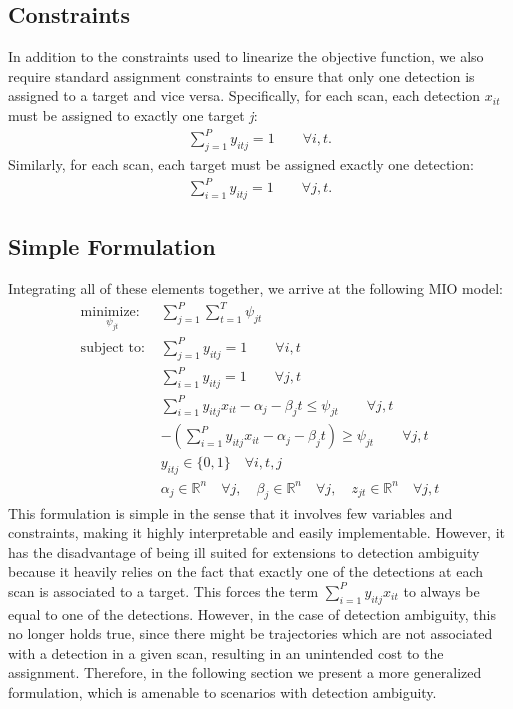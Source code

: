 \subsection{Constraints}
In addition to the constraints used to linearize the objective function, we also require standard assignment constraints to ensure that only one detection is assigned to a target and vice versa. Specifically, for each scan, each detection $x_{it}$ must be assigned to exactly one target \textit{j}:
\begin{align}\label{eq:all_detections}
\sum_{j=1}^{P} y_{itj} = 1 \qquad \forall i,t.
\end{align}
Similarly, for each scan, each target must be assigned exactly one detection:
\begin{align}\label{eq:all_targets}
\sum_{i=1}^{P} y_{itj} = 1 \qquad \forall j,t.
\end{align}

\subsection{Simple Formulation}
Integrating all of these elements together, we arrive at the following MIO model:
\begin{align}
\underset{\psi_{jt}}{\text{minimize: }} & \sum_{j=1}^{P} \sum_{t=1}^{T} \psi_{jt} \label{eq:simple_problem} \\
\text{subject to: }	& \sum_{j=1}^{P} y_{itj} = 1 \qquad \forall i,t\nonumber \\
				& \sum_{i=1}^{P} y_{itj} = 1 \qquad \forall j,t\nonumber \\
				& \sum_{i=1}^{P}y_{itj}x_{it} - \alpha_{j} - \beta_{j}t \leq \psi_{jt} \qquad \forall j,t \nonumber \\
				& -\left(\sum_{i=1}^{P}y_{itj}x_{it} - \alpha_{j} - \beta_{j}t\right) \geq \psi_{jt} \qquad \forall j,t \nonumber \\
			 	& y_{itj} \in \{0,1\} \quad \forall i,t,j \nonumber\\
				& \alpha_{j} \in \mathbb{R}^n \quad \forall j,\quad \beta_{j} \in \mathbb{R}^n \quad \forall j, \quad z_{jt} \in \mathbb{R}^n \quad \forall j,t \nonumber
\end{align}
This formulation is simple in the sense that it involves few variables and constraints, making it highly interpretable and easily implementable. However, it has the disadvantage of being ill suited for extensions to detection ambiguity because it heavily relies on the fact that exactly one of the detections at each scan is associated to a target. This forces the term $\sum_{i=1}^{P}y_{itj}x_{it}$ to always be equal to one of the detections. However, in the case of detection ambiguity, this no longer holds true, since there might be trajectories which are not associated with a detection in a given scan, resulting in an unintended cost to the assignment. Therefore, in the following section we present a more generalized formulation, which is amenable to scenarios with detection ambiguity.

